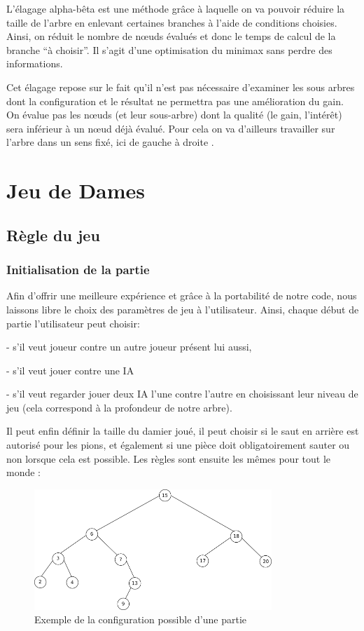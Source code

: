 \documentclass[12,french]{report}
\begin{document}
L'élagage alpha-bêta est une méthode grâce à laquelle on
va pouvoir réduire la taille de l'arbre en enlevant certaines branches
à l'aide de conditions choisies. Ainsi, on réduit le nombre de nœuds
évalués et donc le temps de calcul de la branche ``à choisir''.
Il s'agit d'une optimisation du minimax sans perdre des informations. 

Cet élagage repose sur le fait qu'il n'est pas nécessaire d'examiner
les sous arbres dont la configuration et le résultat ne permettra
pas une amélioration du gain. On évalue pas les nœuds (et leur sous-arbre)
dont la qualité (le gain, l'intérêt) sera inférieur à un nœud déjà
évalué. Pour cela on va d'ailleurs travailler sur l'arbre dans un
sens fixé, ici de gauche à droite . 


\chapter{Jeu de Dames}

\section{Règle du jeu}


\subsection{Initialisation de la partie}

Afin d'offrir une meilleure expérience et grâce à la portabilité de notre code, nous laissons libre le choix des paramètres de jeu à l'utilisateur. Ainsi, chaque début de partie l'utilisateur peut choisir:

- s'il veut joueur contre un autre joueur présent lui aussi, 

- s'il veut jouer contre une IA 

- s'il veut regarder jouer deux IA l'une contre l'autre en choisissant leur niveau de jeu (cela correspond à la profondeur de notre arbre). 

Il peut enfin définir la taille du damier joué, il peut choisir si le saut en arrière est autorisé pour les pions, et également si une pièce doit obligatoirement sauter ou non lorsque cela est possible. Les règles sont ensuite les mêmes pour tout le monde :\\
\begin{figure}[H]
	\center
	\includegraphics[width=0.8\textwidth]{./Images/arbre} %
	\caption{Exemple de la configuration possible d'une partie}
\end{figure}\vspace{0.2cm}
\end{document}
